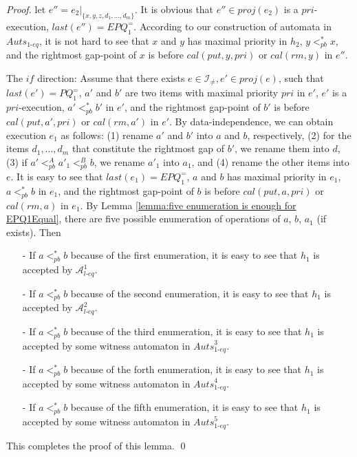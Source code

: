 \begin {proof}
let $e'' = e_2 \vert_{ \{ x,y,z,d_1,\ldots,d_m \} }$. It is obvious that $e'' \in \textit{proj}(e_2)$ is a $\textit{pri}$-execution, $\textit{last}(e'') = \textit{EPQ}_1^{=}$. According to our construction of automata in $\textit{Auts}_{\textit{1-eq}}$, it is not hard to see that $x$ and $y$ has maximal priority in $h_2$, $y <_{\textit{pb}}^* x$, and the rightmost gap-point of $x$ is before $\textit{cal}(\textit{put},y,\textit{pri})$ or $\textit{cal}(\textit{rm},y)$ in $e''$.

\noindent The $\textit{if}$ direction: Assume that there exists $e \in \mathcal{I}_{\neq},e' \in \textit{proj}(e)$, such that $last(e')=\textit{PQ}_1^{=}$, $a'$ and $b'$ are two items with maximal priority $\textit{pri}$ in $e'$, $e'$ is a $\textit{pri}$-execution, $a' <_{\textit{pb}}^* b'$ in $e'$, and the rightmost gap-point of $b'$ is before $\textit{cal}(\textit{put},a',\textit{pri})$ or $\textit{cal}(\textit{rm},a')$ in $e'$. By data-independence, we can obtain execution $e_1$ as follows: (1) rename $a'$ and $b'$ into $a$ and $b$, respectively, (2) for the items $d_1,\ldots,d_m$ that constitute the rightmost gap of $b'$, we rename them into $d$, (3) if $a' <_{\textit{pb}}^A a'_1 <_{\textit{pb}}^B b$, we rename $a'_1$ into $a_1$, and (4) rename the other items into $e$. It is easy to see that $\textit{last}(e_1) = \textit{EPQ}_1^{=}$, $a$ and $b$ has maximal priority in $e_1$, $a <_{\textit{pb}}^* b$ in $e_1$, and the rightmost gap-point of $b$ is before $\textit{cal}(\textit{put},a,\textit{pri})$ or $\textit{cal}(\textit{rm},a)$ in $e_1$. By Lemma \ref{lemma:five enumeration is enough for EPQ1Equal}, there are five possible enumeration of operations of $a$, $b$, $a_1$ (if exists). Then


\begin{itemize}
\setlength{\itemsep}{0.5pt}
\item[-] If $a <_{\textit{pb}}^* b$ because of the first enumeration, it is easy to see that $h_1$ is accepted by $\mathcal{A}_{\textit{l-eq}}^1$.

\item[-] If $a <_{\textit{pb}}^* b$ because of the second enumeration, it is easy to see that $h_1$ is accepted by $\mathcal{A}_{\textit{l-eq}}^2$.

\item[-] If $a <_{\textit{pb}}^* b$ because of the third enumeration, it is easy to see that $h_1$ is accepted by some witness automaton in $\textit{Auts}_{\textit{1-eq}}^{3}$.

\item[-] If $a <_{\textit{pb}}^* b$ because of the forth enumeration, it is easy to see that $h_1$ is accepted by some witness automaton in $\textit{Auts}_{\textit{1-eq}}^{4}$.

\item[-] If $a <_{\textit{pb}}^* b$ because of the fifth enumeration, it is easy to see that $h_1$ is accepted by some witness automaton in $\textit{Auts}_{\textit{1-eq}}^{5}$.
\end{itemize}

This completes the proof of this lemma. \qed
\end {proof}





